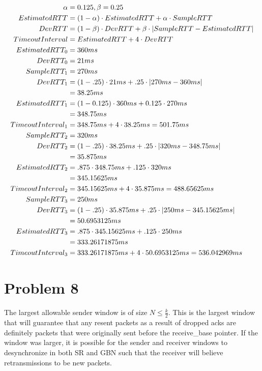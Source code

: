 \documentclass[letter,10pt]{article}
\DeclarePairedDelimiter\abs{\lvert}{\rvert}%
\begin{document}
\begin{align}
\alpha &= 0.125, \beta = 0.25 \\
EstimatedRTT &= (1 - \alpha) \cdot EstimatedRTT + \alpha \cdot SampleRTT \\
DevRTT &= (1 - \beta) \cdot DevRTT + \beta \cdot \abs*{SampleRTT - EstimatedRTT} \\
TimeoutInterval &= EstimatedRTT + 4 \cdot DevRTT \\
~
EstimatedRTT_0 &= 360ms\\
DevRTT_0 &= 21ms \\
~
SampleRTT_1 &= 270ms \\
DevRTT_1 &= (1 - .25) \cdot 21ms + .25 \cdot \abs*{270ms - 360ms} \\
&= 38.25ms \\
EstimatedRTT_1 &= (1 - 0.125) \cdot 360ms + 0.125 \cdot 270ms \\
&= 348.75ms \\
TimeoutInterval_1 &= 348.75ms + 4 \cdot 38.25ms  = 501.75ms\\
~
SampleRTT_2 &= 320ms \\
DevRTT_2 &= (1 - .25) \cdot 38.25ms + .25 \cdot \abs*{320ms - 348.75ms} \\
&=  35.875ms \\
EstimatedRTT_2 &= .875 \cdot 348.75ms + .125 \cdot 320ms \\
&= 345.15625ms \\
TimeoutInterval_2 &= 345.15625ms + 4 \cdot 35.875ms = 488.65625ms\\
~
SampleRTT_3 &= 250ms \\
DevRTT_3 &= (1 - .25) \cdot 35.875ms + .25 \cdot \abs*{250ms - 345.15625ms} \\
&= 50.6953125ms \\
EstimatedRTT_3 &= .875 \cdot 345.15625ms + .125 \cdot 250ms \\
&= 333.26171875ms \\
TimeoutInterval_3 &= 333.26171875ms + 4 \cdot 50.6953125ms = 536.042969ms 
\end{align}

\section{Problem 8}
The largest allowable sender window is of size $N \leq \frac{k}{2}$. This is the largest window that will guarantee that any resent packets as a result of dropped acks are definitely packets that were originally sent before the receive\_base pointer. If the window was larger, it is possible for the sender and receiver windows to desynchronize in both SR and GBN such that the receiver will believe retransmissions to be new packets. 
\end{document}
